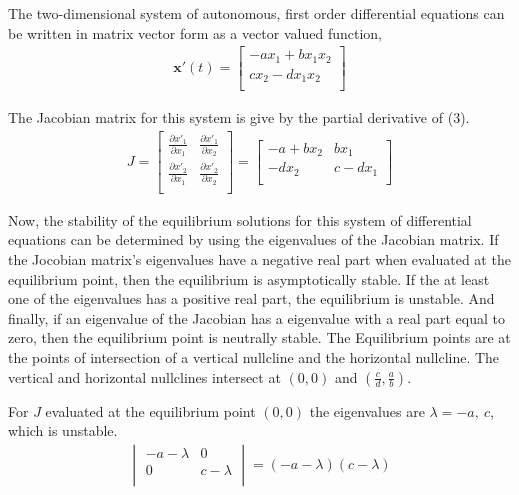 \documentclass[12pt]{article}   %
\theoremstyle{definition}
\numberwithin{equation}{section}
\begin{document}
The two-dimensional system of autonomous, first order differential equations can be written in matrix vector form as a vector valued function, 
\begin{align*} 
  \textbf{x}'(t) 
  = 
  \begin{bmatrix}
    -ax_1 + bx_1x_2\\
    cx_2 - dx_1x_2\\
  \end{bmatrix}
\end{align*}

The Jacobian matrix for this system is give by the partial derivative of (3).
\begin{align*} 
  J 
  =
  \begin{bmatrix}
    \frac{\partial{x'_1}}{\partial{x_1}} & \frac{\partial{x'_1}}{\partial{x_2}}\\
    \frac{\partial{x'_2}}{\partial{x_1}} &  \frac{\partial{x'_2}}{\partial{x_2}}\\
  \end{bmatrix}
  =
  \begin{bmatrix}
    -a+bx_2 & bx_1\\
    -dx_2 & c-dx_1\\
  \end{bmatrix}
\end{align*}

\quad Now, the stability of the equilibrium solutions for this system of differential equations can be determined by using the eigenvalues of the Jacobian matrix. If the Jocobian matrix's eigenvalues have a negative real part when evaluated at the equilibrium point, then the equilibrium is asymptotically stable. If the at least one of the eigenvalues has a positive real part, the equilibrium is unstable. And finally, if an eigenvalue of the Jacobian has a eigenvalue with a real part equal to zero, then the equilibrium point is neutrally stable. The Equilibrium points are at the points of intersection of a vertical nullcline and the horizontal nullcline. The vertical and horizontal nullclines intersect at $(0,0)$ and $(\frac{c}{d},\frac{a}{b})$.  

For $J$ evaluated at the equilibrium point $(0,0)$ the eigenvalues are $\lambda=-a,\ c$, which is unstable.
\begin{align*}
  \begin{vmatrix}
    -a-\lambda &0\\
    0& c-\lambda\\
  \end{vmatrix}
  =(-a-\lambda)(c-\lambda)
\end{align*}
\end{document}

